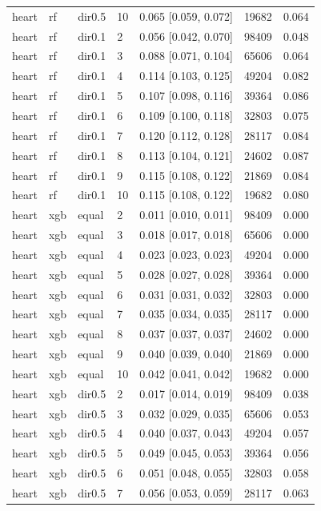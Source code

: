 \begin{tabular}{lllllll}
heart & rf & dir0.5 & 10 & 0.065 [0.059, 0.072] & 19682 & 0.064 \\
heart & rf & dir0.1 & 2 & 0.056 [0.042, 0.070] & 98409 & 0.048 \\
heart & rf & dir0.1 & 3 & 0.088 [0.071, 0.104] & 65606 & 0.064 \\
heart & rf & dir0.1 & 4 & 0.114 [0.103, 0.125] & 49204 & 0.082 \\
heart & rf & dir0.1 & 5 & 0.107 [0.098, 0.116] & 39364 & 0.086 \\
heart & rf & dir0.1 & 6 & 0.109 [0.100, 0.118] & 32803 & 0.075 \\
heart & rf & dir0.1 & 7 & 0.120 [0.112, 0.128] & 28117 & 0.084 \\
heart & rf & dir0.1 & 8 & 0.113 [0.104, 0.121] & 24602 & 0.087 \\
heart & rf & dir0.1 & 9 & 0.115 [0.108, 0.122] & 21869 & 0.084 \\
heart & rf & dir0.1 & 10 & 0.115 [0.108, 0.122] & 19682 & 0.080 \\
heart & xgb & equal & 2 & 0.011 [0.010, 0.011] & 98409 & 0.000 \\
heart & xgb & equal & 3 & 0.018 [0.017, 0.018] & 65606 & 0.000 \\
heart & xgb & equal & 4 & 0.023 [0.023, 0.023] & 49204 & 0.000 \\
heart & xgb & equal & 5 & 0.028 [0.027, 0.028] & 39364 & 0.000 \\
heart & xgb & equal & 6 & 0.031 [0.031, 0.032] & 32803 & 0.000 \\
heart & xgb & equal & 7 & 0.035 [0.034, 0.035] & 28117 & 0.000 \\
heart & xgb & equal & 8 & 0.037 [0.037, 0.037] & 24602 & 0.000 \\
heart & xgb & equal & 9 & 0.040 [0.039, 0.040] & 21869 & 0.000 \\
heart & xgb & equal & 10 & 0.042 [0.041, 0.042] & 19682 & 0.000 \\
heart & xgb & dir0.5 & 2 & 0.017 [0.014, 0.019] & 98409 & 0.038 \\
heart & xgb & dir0.5 & 3 & 0.032 [0.029, 0.035] & 65606 & 0.053 \\
heart & xgb & dir0.5 & 4 & 0.040 [0.037, 0.043] & 49204 & 0.057 \\
heart & xgb & dir0.5 & 5 & 0.049 [0.045, 0.053] & 39364 & 0.056 \\
heart & xgb & dir0.5 & 6 & 0.051 [0.048, 0.055] & 32803 & 0.058 \\
heart & xgb & dir0.5 & 7 & 0.056 [0.053, 0.059] & 28117 & 0.063 \\

\end{tabular}
